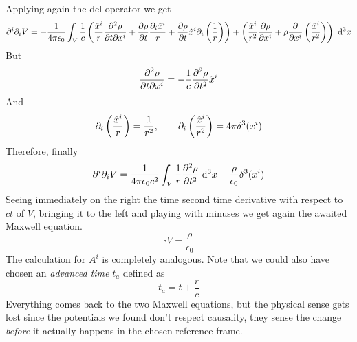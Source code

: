 \documentclass[../electromagnetism.tex]{subfiles}
\begin{document}
Applying again the del operator we get
\begin{equation*}
	\partial^i\partial_iV=-\frac{1}{4\pi\epsilon_0}\int_{V}^{}\frac{1}{c}\left( \frac{\hat{x}^i}{r}\pdv[2]{\rho}{t}{x^i}+\pdv{\rho}{t}\frac{\partial_i\hat{x}^i}{r}+\pdv{\rho}{t}\hat{x}^i\partial_i\left( \frac{1}{r} \right) \right) +\left( \frac{\hat{x}^i}{r^2}\pdv{\rho}{x^i}+\rho\pdv{x^i}\left( \frac{\hat{x}^i}{r^2} \right) \right)\ \mathrm{d}^3{x}
\end{equation*}
But
\begin{equation*}
	\pdv[2]{\rho}{t}{x^i}=-\frac{1}{c}\pdv[2]{\rho}{t}\hat{x}^i
\end{equation*}
And
\begin{equation*}
	\partial_i\left( \frac{\hat{x}^i}{r} \right)=\frac{1}{r^2},\qquad\partial_i\left( \frac{\hat{x}^i}{r^2} \right)=4\pi\delta^3(x^i)
\end{equation*}
Therefore, finally
\begin{equation}
	\partial^i\partial_iV=\frac{1}{4\pi\epsilon_0c^2}\int_{V}^{}\frac{1}{r}\pdv[2]{\rho}{t}\ \mathrm{d}^{3}{x}-\frac{\rho}{\epsilon_0}\delta^3(x^i)
	\label{eq:lablas}
\end{equation}
Seeing immediately on the right the time second time derivative with respect to $ct$ of $V$, bringing it to the left and playing with minuses we get again the awaited Maxwell equation.
\begin{equation*}
	\square V=\frac{\rho}{\epsilon_0}
\end{equation*}
The calculation for $A^i$ is completely analogous. Note that we could also have chosen an \textit{advanced time} $t_a$ defined as
\begin{equation*}
	t_a=t+\frac{r}{c}
\end{equation*}
Everything comes back to the two Maxwell equations, but the physical sense gets lost since the potentials we found don't respect causality, they sense the change \emph{before} it actually happens in the chosen reference frame.
\end{document}
